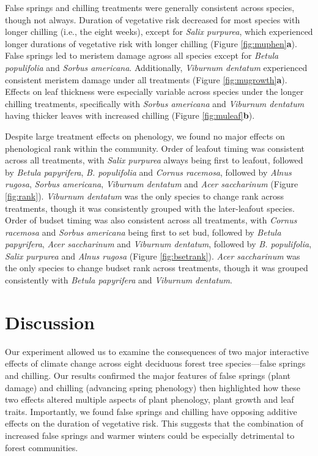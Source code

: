 \documentclass{article}\usepackage[]{graphicx}\usepackage[]{color}
\begin{document}
False springs and chilling treatments were generally consistent across species, though not always. Duration of vegetative risk decreased for most species with longer chilling (i.e., the eight weeks), except for \textit{Salix purpurea}, which experienced longer durations of vegetative risk with longer chilling (Figure \ref{fig:muphen}\textbf{a}). False springs led to meristem damage agross all species except for \textit{Betula populifolia} and \textit{Sorbus americana}. Additionally, \textit{Viburnum dentatum} experienced consistent meristem damage under all treatments (Figure \ref{fig:mugrowth}\textbf{a}). Effects on leaf thickness were especially variable across species under the longer chilling treatments, specifically with \textit{Sorbus americana} and \textit{Viburnum dentatum} having thicker leaves with increased chilling (Figure \ref{fig:muleaf}\textbf{b}). 
  
Despite large treatment effects on phenology, we found no major effects on phenological rank within the community. Order of leafout timing was consistent across all treatments, with \textit{Salix purpurea} always being first to leafout, followed by \textit{Betula papyrifera}, \textit{B. populifolia} and \textit{Cornus racemosa}, followed by \textit{Alnus rugosa}, \textit{Sorbus americana}, \textit{Viburnum dentatum} and \textit{Acer saccharinum} (Figure \ref{fig:rank}). \textit{Viburnum dentatum} was the only species to change rank across treatments, though it was consistently grouped with the later-leafout  species. Order of budset timing was also consistent across all treatments, with \textit{Cornus racemosa} and \textit{Sorbus americana} being first to set bud, followed by \textit{Betula papyrifera}, \textit{Acer saccharinum} and \textit{Viburnum dentatum}, followed by \textit{B. populifolia}, \textit{Salix purpurea} and \textit{Alnus rugosa} (Figure \ref{fig:bsetrank}). \textit{Acer saccharinum} was the only species to change budset rank across treatments, though it was grouped consistently with \textit{Betula papyrifera} and \textit{Viburnum dentatum}.

\section*{Discussion} 
Our experiment allowed us to examine the consequences of two major interactive effects of climate change across eight deciduous forest tree species---false springs and chilling. Our results confirmed the major features of false springs (plant damage) and chilling (advancing spring phenology) then highlighted how these two effects altered multiple aspects of plant phenology, plant growth and leaf traits. Importantly, we found false springs and chilling have opposing additive effects on the duration of vegetative risk. This suggests that the combination of increased false springs and warmer winters could be especially detrimental to forest communities.
\end{document}
